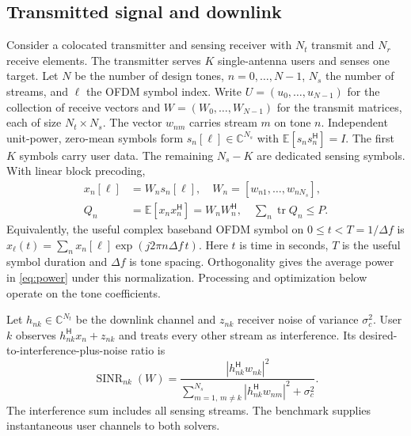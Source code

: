 \documentclass[journal]{IEEEtran}
\DeclareMathOperator{\tr}{tr}
\newcommand{\Hh}{^{\mathsf H}}
\newcommand{\E}{\mathbb E}
\newcommand{\C}{\mathbb C}
\newcommand{\sn}{\operatorname{SINR}}
\begin{document}
\subsection{Transmitted signal and downlink}
Consider a colocated transmitter and sensing receiver with $N_t$ transmit and $N_r$ receive elements. The transmitter serves $K$ single-antenna users and senses one target. Let $N$ be the number of design tones, $n=0,\ldots,N-1$, $N_s$ the number of streams, and $\ell$ the OFDM symbol index. Write $U=(u_0,\ldots,u_{N-1})$ for the collection of receive vectors and $W=(W_0,\ldots,W_{N-1})$ for the transmit matrices, each of size $N_t\times N_s$. The vector $w_{nm}$ carries stream $m$ on tone $n$. Independent unit-power, zero-mean symbols form $s_n[\ell]\in\C^{N_s}$ with $\E[s_ns_n\Hh]=I$. The first $K$ symbols carry user data. The remaining $N_s-K$ are dedicated sensing symbols. With linear block precoding,
\begin{align}
 x_n[\ell]&=W_n s_n[\ell],\quad W_n=[w_{n1},\ldots,w_{nN_s}],\\
 Q_n&=\E[x_nx_n\Hh]=W_nW_n\Hh,\quad
 \sum_n\tr Q_n\le P. \label{eq:power}
\end{align}
Equivalently, the useful complex baseband OFDM symbol on $0\le t<T=1/\Delta f$ is $x_\ell(t)=\sum_n x_n[\ell]\exp(j2\pi n\Delta f\,t)$. Here $t$ is time in seconds, $T$ is the useful symbol duration and $\Delta f$ is tone spacing. Orthogonality gives the average power in \eqref{eq:power} under this normalization. Processing and optimization below operate on the tone coefficients.

Let $h_{nk}\in\C^{N_t}$ be the downlink channel and $z_{nk}$ receiver noise of variance $\sigma_c^2$. User $k$ observes $h_{nk}\Hh x_n+z_{nk}$ and treats every other stream as interference. Its desired-to-interference-plus-noise ratio is
\begin{equation}
 \sn_{nk}(W)=\frac{|h_{nk}\Hh w_{nk}|^2}
 {\sum_{m=1,\,m\ne k}^{N_s}|h_{nk}\Hh w_{nm}|^2+\sigma_c^2}.
 \label{eq:sinr}
\end{equation}
The interference sum includes all sensing streams. The benchmark supplies instantaneous user channels to both solvers.
\end{document}

